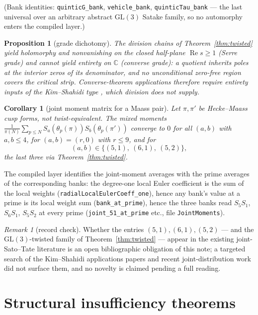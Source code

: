 \documentclass[11pt]{article}
\newtheorem{proposition}[theorem]{Proposition}
\newtheorem{corollary}[theorem]{Corollary}
\theoremstyle{definition}
\theoremstyle{remark}
\newtheorem{remark}[theorem]{Remark}
\newcommand{\GL}{\mathrm{GL}}
\newcommand{\C}{\mathbb{C}}
\renewcommand{\Re}{\operatorname{Re}}
\begin{document}
(Bank identities: \texttt{quinticG\_bank}, \texttt{vehicle\_bank},
\texttt{quinticTau\_bank} --- the last universal over an arbitrary abstract
$\GL(3)$ Satake family, so no automorphy enters the compiled layer.)

\begin{proposition}[grade dichotomy]\label{prop:grade}
The division chains of Theorem~\ref{thm:twisted} yield holomorphy and
nonvanishing on the closed half-plane $\Re s\ge1$ (\emph{Serre grade}) and
cannot yield entirety on $\C$ (\emph{converse grade}): a quotient inherits
poles at the interior zeros of its denominator, and no unconditional
zero-free region covers the critical strip.  Converse-theorem applications
therefore require entirety inputs of the Kim--Shahidi type
\cite{KimShahidiEntire}, which division does not supply.
\end{proposition}

\begin{corollary}[joint moment matrix for a Maass pair]\label{cor:joint}
Let $\pi,\pi'$ be Hecke--Maass cusp forms, not twist-equivalent.  The mixed
moments $\tfrac{1}{\pi(N)}\sum_{p\le N}S_a(\theta_p(\pi))S_b(\theta_p(\pi'))$
converge to $0$ for all $(a,b)$ with $a,b\le 4$, for $(a,b)=(r,0)$ with
$r\le 9$, and for
\[
(a,b)\in\{(5,1),\ (6,1),\ (5,2)\},
\]
the last three via Theorem~\ref{thm:twisted}.
\end{corollary}

The compiled layer identifies the joint-moment averages with the prime
averages of the corresponding banks: the degree-one local Euler coefficient
is the sum of the local weights (\texttt{radialLocalEulerCoeff\_one}), hence
any bank's value at a prime is its local weight sum
(\texttt{bank\_at\_prime}), hence the three banks read
$S_5S_1$, $S_6S_1$, $S_5S_2$ at every prime
(\texttt{joint\_51\_at\_prime} etc., file \texttt{JointMoments}).

\begin{remark}[record check]\label{rem:check}
Whether the entries $(5,1),(6,1),(5,2)$ --- and the $\GL(3)$-twisted family
of Theorem~\ref{thm:twisted} --- appear in the existing joint-Sato--Tate
literature is an open bibliographic obligation of this note; a targeted
search of the Kim--Shahidi applications papers and recent joint-distribution
work did not surface them, and no novelty is claimed pending a full reading.
\end{remark}

\section{Structural insufficiency theorems}\label{sec:insufficiency}
\end{document}
